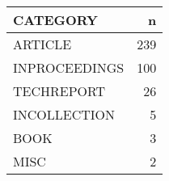 
\begin{tabular}{lr}
\toprule
CATEGORY & n\\
\midrule
ARTICLE & 239\\
INPROCEEDINGS & 100\\
TECHREPORT & 26\\
INCOLLECTION & 5\\
BOOK & 3\\
\addlinespace
MISC & 2\\
\bottomrule
\end{tabular}